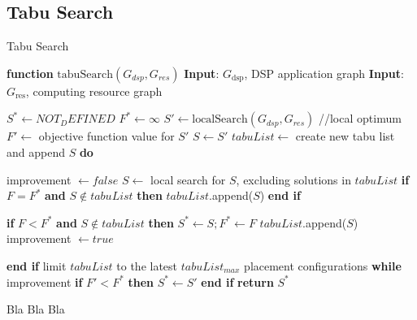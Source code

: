 \documentclass{article}
\begin{document}
\subsection{Tabu Search}

\begin{minipage}{0.5\textwidth}

\begin{algorithm}[H]
    \caption{Tabu Search}
    \begin{algorithmic}
        \STATE \textbf{function} $\mathrm{tabuSearch}(G_{dsp}, G_{res})$
        \STATE \textbf{Input}: $G_{\text{dsp}}$, DSP application graph
        \STATE \textbf{Input}: $G_{\text{res}}$, computing resource graph

        \STATE $S^* \leftarrow NOT_DEFINED$
        \STATE $F^* \leftarrow \infty$
        \STATE $S' \leftarrow \text{localSearch}(G_{dsp}, G_{res})$   //local optimum
        \STATE $F' \leftarrow$ objective function value for $S'$
        \STATE $S  \leftarrow S'$
        \STATE $tabuList \leftarrow$ create new tabu list and append $S$
        \STATE \textbf{do}

        \STATE \hspace{\algorithmicindent} improvement $\leftarrow false$
        \STATE \hspace{\algorithmicindent} $S \leftarrow$  local search for $S$, excluding solutions in $tabuList$
        \STATE \hspace{\algorithmicindent} \textbf{if} $F = F^*$ \textbf{and} $S \notin tabuList$ \textbf{then} $tabuList$.append($S$) 
        \STATE \hspace{\algorithmicindent} \textbf{end if}

        \STATE \hspace{\algorithmicindent} \textbf{if} $F < F^*$ \textbf{and} $S \notin tabuList$ \textbf{then} 
        \STATE \hspace{\algorithmicindent} \hspace{\algorithmicindent} $S^* \leftarrow S; F^* \leftarrow F$
        \STATE \hspace{\algorithmicindent} \hspace{\algorithmicindent} $tabuList$.append($S$)
        \STATE \hspace{\algorithmicindent} \hspace{\algorithmicindent} improvement $\leftarrow true$

        \STATE \hspace{\algorithmicindent} \textbf{end if}
        \STATE \hspace{\algorithmicindent} limit $tabuList$ to the latest $tabuList_{max}$ placement configurations
        \STATE \textbf{while} improvement
        \STATE \textbf{if} $F' < F^*$ \textbf{then} $S^* \leftarrow S'$ \textbf{end if}
        \STATE \textbf{return} $S^*$

    \end{algorithmic}
\end{algorithm}

\end{minipage}  
\begin{minipage}{0.5\textwidth}
    Bla Bla Bla
\end{minipage}




\end{document}
